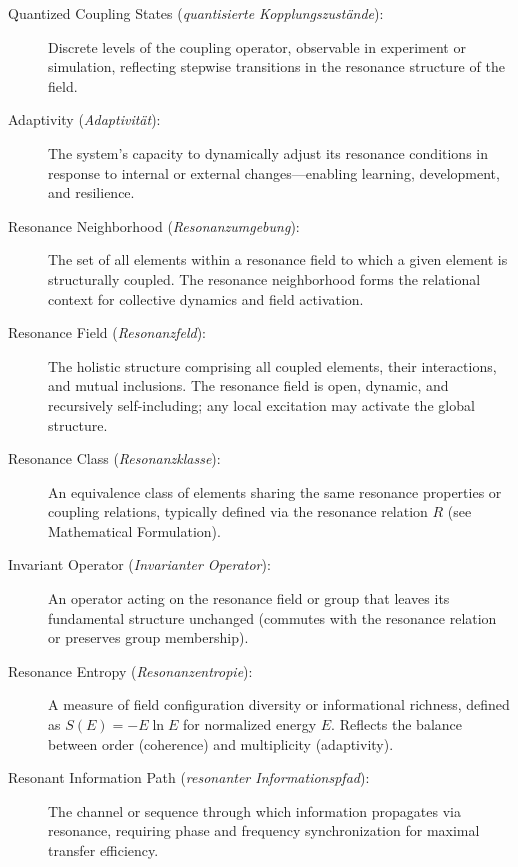 \documentclass[12pt]{iopart}
\begin{document}
\begin{description}
	\item[Quantized Coupling States (\textit{quantisierte Kopplungszustände}):]  
	Discrete levels of the coupling operator, observable in experiment or simulation, reflecting stepwise transitions in the resonance structure of the field.
	
	\item[Adaptivity (\textit{Adaptivität}):]  
	The system’s capacity to dynamically adjust its resonance conditions in response to internal or external changes—enabling learning, development, and resilience.
	
	\item[Resonance Neighborhood (\textit{Resonanzumgebung}):]  
	The set of all elements within a resonance field to which a given element is structurally coupled. The resonance neighborhood forms the relational context for collective dynamics and field activation.
	
	\item[Resonance Field (\textit{Resonanzfeld}):]  
	The holistic structure comprising all coupled elements, their interactions, and mutual inclusions. The resonance field is open, dynamic, and recursively self-including; any local excitation may activate the global structure.
	
	\item[Resonance Class (\textit{Resonanzklasse}):]  
	An equivalence class of elements sharing the same resonance properties or coupling relations, typically defined via the resonance relation $R$ (see Mathematical Formulation).
	
	\item[Invariant Operator (\textit{Invarianter Operator}):]  
	An operator acting on the resonance field or group that leaves its fundamental structure unchanged (commutes with the resonance relation or preserves group membership).
	
	\item[Resonance Entropy (\textit{Resonanzentropie}):]  
	A measure of field configuration diversity or informational richness, defined as $S(E) = -E \ln E$ for normalized energy $E$. Reflects the balance between order (coherence) and multiplicity (adaptivity).
	
	\item[Resonant Information Path (\textit{resonanter Informationspfad}):]  
	The channel or sequence through which information propagates via resonance, requiring phase and frequency synchronization for maximal transfer efficiency.
	
\end{description}
\end{document}
